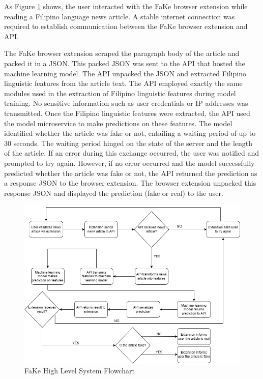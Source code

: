 As Figure \ref{SystemFlowchart} shows, the user interacted with the FaKe browser extension while reading a Filipino language news article. A stable internet connection was required to establish communication between the FaKe browser extension and API.

The FaKe browser extension scraped the paragraph body of the article and packed it in a JSON. This packed JSON was sent to the API that hosted the machine learning model. The API unpacked the JSON and extracted Filipino linguistic features from the article text. The API employed exactly the same modules used in the extraction of Filipino linguistic features during model training. No sensitive information such as user credentials or IP addresses was transmitted. Once the Filipino linguistic features were extracted, the API used the model microservice to make predictions on these features. The model identified whether the article was fake or not, entailing a waiting period of up to 30 seconds. The waiting period hinged on the state of the server and the length of the article. If an error during this exchange occurred, the user was notified and prompted to try again. However, if no error occurred and the model successfully predicted whether the article was fake or not, the API returned the prediction as a response JSON to the browser extension. The browser extension unpacked this response JSON and displayed the prediction (fake or real) to the user.

\begin{figure}[h]
\includegraphics[width=\textwidth,height=\textheight,keepaspectratio]{figures/FakeSystemFlowchart.png}
  \caption{FaKe High Level System Flowchart}
  \label{SystemFlowchart}
\end{figure}
\clearpage

